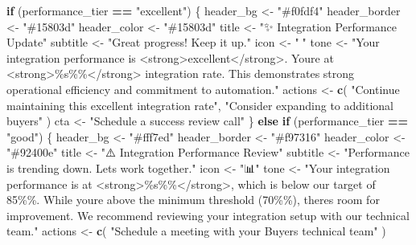 \documentclass[
]{article}
\newenvironment{Shaded}{\begin{snugshade}}{\end{snugshade}}
\newcommand{\ControlFlowTok}[1]{\textcolor[rgb]{0.13,0.29,0.53}{\textbf{#1}}}
\newcommand{\FunctionTok}[1]{\textcolor[rgb]{0.13,0.29,0.53}{\textbf{#1}}}
\newcommand{\NormalTok}[1]{#1}
\newcommand{\OtherTok}[1]{\textcolor[rgb]{0.56,0.35,0.01}{#1}}
\newcommand{\SpecialCharTok}[1]{\textcolor[rgb]{0.81,0.36,0.00}{\textbf{#1}}}
\newcommand{\StringTok}[1]{\textcolor[rgb]{0.31,0.60,0.02}{#1}}
\begin{document}
\begin{Shaded}
\begin{Highlighting}[]
      \ControlFlowTok{if}\NormalTok{ (performance\_tier }\SpecialCharTok{==} \StringTok{"excellent"}\NormalTok{) \{}
\NormalTok{        header\_bg }\OtherTok{\textless{}{-}} \StringTok{"\#f0fdf4"}
\NormalTok{        header\_border }\OtherTok{\textless{}{-}} \StringTok{"\#15803d"}
\NormalTok{        header\_color }\OtherTok{\textless{}{-}} \StringTok{"\#15803d"}
\NormalTok{        title }\OtherTok{\textless{}{-}} \StringTok{"✨ Integration Performance Update"}
\NormalTok{        subtitle }\OtherTok{\textless{}{-}} \StringTok{"Great progress! Keep it up."}
\NormalTok{        icon }\OtherTok{\textless{}{-}} \StringTok{"🌟"}
\NormalTok{        tone }\OtherTok{\textless{}{-}} \StringTok{"Your integration performance is \textless{}strong\textgreater{}excellent\textless{}/strong\textgreater{}. You\textquotesingle{}re at \textless{}strong\textgreater{}\%s\%\%\textless{}/strong\textgreater{} integration rate. This demonstrates strong operational efficiency and commitment to automation."}
\NormalTok{        actions }\OtherTok{\textless{}{-}} \FunctionTok{c}\NormalTok{(}
          \StringTok{"Continue maintaining this excellent integration rate"}\NormalTok{,}
          \StringTok{"Consider expanding to additional buyers"}
\NormalTok{        )}
\NormalTok{        cta }\OtherTok{\textless{}{-}} \StringTok{"Schedule a success review call"}
\NormalTok{      \} }\ControlFlowTok{else} \ControlFlowTok{if}\NormalTok{ (performance\_tier }\SpecialCharTok{==} \StringTok{"good"}\NormalTok{) \{}
\NormalTok{        header\_bg }\OtherTok{\textless{}{-}} \StringTok{"\#fff7ed"}
\NormalTok{        header\_border }\OtherTok{\textless{}{-}} \StringTok{"\#f97316"}
\NormalTok{        header\_color }\OtherTok{\textless{}{-}} \StringTok{"\#92400e"}
\NormalTok{        title }\OtherTok{\textless{}{-}} \StringTok{"⚠️ Integration Performance Review"}
\NormalTok{        subtitle }\OtherTok{\textless{}{-}} \StringTok{"Performance is trending down. Let\textquotesingle{}s work together."}
\NormalTok{        icon }\OtherTok{\textless{}{-}} \StringTok{"📊"}
\NormalTok{        tone }\OtherTok{\textless{}{-}} \StringTok{"Your integration performance is at \textless{}strong\textgreater{}\%s\%\%\textless{}/strong\textgreater{}, which is below our target of 85\%\%. While you\textquotesingle{}re above the minimum threshold (70\%\%), there\textquotesingle{}s room for improvement. We recommend reviewing your integration setup with our technical team."}
\NormalTok{        actions }\OtherTok{\textless{}{-}} \FunctionTok{c}\NormalTok{(}
          \StringTok{"Schedule a meeting with your Buyers technical team"}
\NormalTok{        )}

\end{Highlighting}
\end{Shaded}
\end{document}
